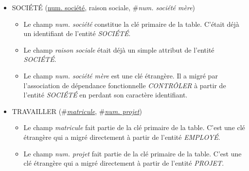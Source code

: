\documentclass[a4paper]{article}
\newcommand{\relat}[1]{\textsc{#1}}
\newcommand{\attr}[1]{#1}
\newcommand{\prim}[1]{\uline{#1}}
\newcommand{\foreign}[1]{\#\textsl{#1}}
\begin{document}
\begin{itemize}
  \item \relat{SOCIÉTÉ} (\prim{num. société}, \attr{raison sociale}, \foreign{num. société mère})
  \begin{itemize}
    \item Le champ \emph{num. société} constitue la clé primaire de la table. C'était déjà un identifiant de l'entité \emph{SOCIÉTÉ}.
    \item Le champ \emph{raison sociale} était déjà un simple attribut de l'entité \emph{SOCIÉTÉ}.
    \item Le champ \emph{num. société mère} est une clé étrangère. Il a migré par l'association de dépendance fonctionnelle \emph{CONTRÔLER} à partir de l'entité \emph{SOCIÉTÉ} en perdant son caractère identifiant.
  \end{itemize}

  \item \relat{TRAVAILLER} (\foreign{\prim{matricule}}, \foreign{\prim{num. projet}})
  \begin{itemize}
    \item Le champ \emph{matricule} fait partie de la clé primaire de la table. C'est une clé étrangère qui a migré directement à partir de l'entité \emph{EMPLOYÉ}.
    \item Le champ \emph{num. projet} fait partie de la clé primaire de la table. C'est une clé étrangère qui a migré directement à partir de l'entité \emph{PROJET}.
  \end{itemize}

\end{itemize}
\end{document}
